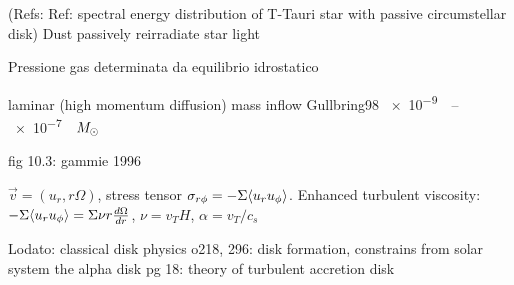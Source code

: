 \begin{workout}
(Refs: Ref: spectral energy distribution of T-Tauri star with passive circumstellar disk)
Dust passively reirradiate star light
\end{workout}

\begin{workout}
Pressione gas determinata da equilibrio idrostatico
\end{workout}

\begin{workout}
laminar (high momentum diffusion)
mass inflow Gullbring98 \SIrange{e-9}{e-7}{\per\year}$M_{\odot}{}$
\end{workout}
\begin{workout}[MRI]
fig 10.3:
gammie 1996
\end{workout}

\begin{workout}
$\vec{v}=(u_r,r\Omega)$, stress tensor $\sigma_{r\phi}=-\Sigma\langle u_ru_{\phi} \rangle$.
Enhanced turbulent viscosity: $-\Sigma\langle u_ru_{\phi} \rangle=\Sigma\nu r\frac{d \Omega}{d r}$, $\nu=v_TH$, $\alpha=v_T/c_s$
\end{workout}

\begin{workout}
Lodato: classical disk physics
o218, 296: disk formation, constrains from solar system
the alpha disk pg 18: theory of turbulent accretion disk
\end{workout}

\begin{workout}

\end{workout}

